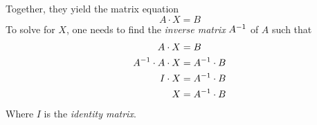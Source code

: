 \begin{definition}
    Together, they yield the matrix equation
    \begin{equation}
        A \cdot X = B
    \end{equation}
    To solve for $X$, one needs to find the \textit{inverse matrix} ${A}^{-1}$ of $A$ such that
    \begin{align}
        A \cdot X                   &= B \\
        {A}^{-1} \cdot A \cdot X &= {A}^{-1} \cdot B \\
        I \cdot X                   &= {A}^{-1} \cdot B \\
        X                           &= {A}^{-1} \cdot B
    \end{align}
    Where $I$ is the \textit{identity matrix}.
\end{definition}

